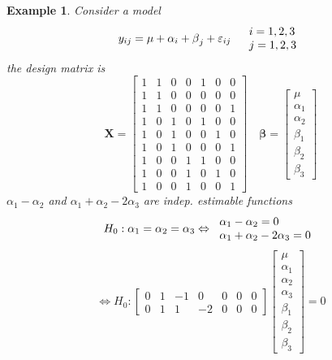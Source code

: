 \documentclass{article}
\newtheorem{example}[theorem]{Example}
\begin{document}
\bigskip

\begin{example}
Consider a model%
\begin{equation*}
y_{ij}=\mu +\alpha _{i}+\beta _{j}+\varepsilon _{ij}\quad 
\begin{tabular}{l}
$i=1,2,3$ \\ 
$j=1,2,3$%
\end{tabular}%
\end{equation*}%
the design matrix is 
\begin{equation*}
\mathbf{X}=\left[ 
\begin{array}{ccccccc}
1 & 1 & 0 & 0 & 1 & 0 & 0 \\ 
1 & 1 & 0 & 0 & 0 & 0 & 0 \\ 
1 & 1 & 0 & 0 & 0 & 0 & 1 \\ 
1 & 0 & 1 & 0 & 1 & 0 & 0 \\ 
1 & 0 & 1 & 0 & 0 & 1 & 0 \\ 
1 & 0 & 1 & 0 & 0 & 0 & 1 \\ 
1 & 0 & 0 & 1 & 1 & 0 & 0 \\ 
1 & 0 & 0 & 1 & 0 & 1 & 0 \\ 
1 & 0 & 0 & 1 & 0 & 0 & 1%
\end{array}%
\right] \quad \mathbf{\beta }=\left[ 
\begin{array}{c}
\mu \\ 
\alpha _{1} \\ 
\alpha _{2} \\ 
\beta _{1} \\ 
\beta _{2} \\ 
\beta _{3}%
\end{array}%
\right]
\end{equation*}%
\newline
\newline
$\alpha _{1}-\alpha _{2}$ and $\alpha _{1}+\alpha _{2}-2\alpha _{3}$ are
indep. estimable functions%
\begin{equation*}
\therefore H_{0}:\alpha _{1}=\alpha _{2}=\alpha _{3}\Leftrightarrow 
\begin{tabular}{l}
$\alpha _{1}-\alpha _{2}=0$ \\ 
$\alpha _{1}+\alpha _{2}-2\alpha _{3}=0$%
\end{tabular}%
\end{equation*}%
\begin{equation*}
\Leftrightarrow H_{0}:\left[ 
\begin{array}{ccccccc}
0 & 1 & -1 & 0 & 0 & 0 & 0 \\ 
0 & 1 & 1 & -2 & 0 & 0 & 0%
\end{array}%
\right] \left[ 
\begin{array}{c}
\mu \\ 
\alpha _{1} \\ 
\alpha _{2} \\ 
\alpha _{3} \\ 
\beta _{1} \\ 
\beta _{2} \\ 
\beta _{3}%
\end{array}%
\right] =0
\end{equation*}
\end{example}
\end{document}
